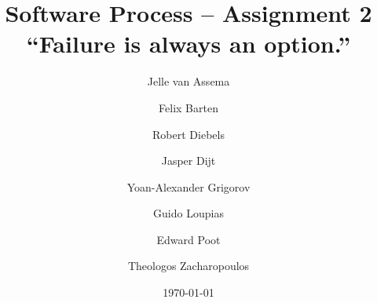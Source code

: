 \documentclass[titlepage, 11pt]{report}
\title{Software Process -- Assignment 2\\
       \small ``Failure is always an option.''
}%
\author{Jelle van Assema 
  \and Felix Barten
  \and Robert Diebels
  \and Jasper Dijt
  \and Yoan-Alexander Grigorov
  \and Guido Loupias
  \and Edward Poot 
  \and Theologos Zacharopoulos
}
\date{\today}
\begin{document}
\maketitle
\tableofcontents{}





%


\begin{appendices}
    
    \printglossary[type=\acronymtype]
    \printglossary
\end{appendices}
\end{document}
